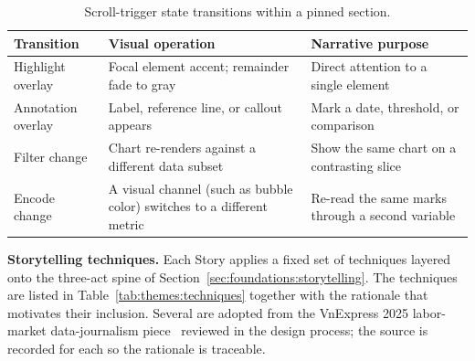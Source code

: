 \begin{table}[!htbp]
\centering
\caption{Scroll-trigger state transitions within a pinned section.}
\label{tab:themes:transitions}
\footnotesize
\renewcommand{\arraystretch}{1.3}
\begin{tabularx}{\linewidth}{p{3.0cm} X X}
\hline
\textbf{Transition} & \textbf{Visual operation} & \textbf{Narrative purpose} \\
\hline
Highlight overlay   & Focal element accent; remainder fade to gray       & Direct attention to a single element \\
Annotation overlay  & Label, reference line, or callout appears          & Mark a date, threshold, or comparison \\
Filter change       & Chart re-renders against a different data subset   & Show the same chart on a contrasting slice \\
Encode change       & A visual channel (such as bubble color) switches to a different metric & Re-read the same marks through a second variable \\
\hline
\end{tabularx}
\end{table}

\noindent\textbf{Storytelling techniques.} Each Story applies a fixed set of techniques layered onto the
three-act spine of Section~\ref{sec:foundations:storytelling}. The
techniques are listed in Table~\ref{tab:themes:techniques} together
with the rationale that motivates their inclusion. Several are adopted
from the VnExpress 2025 labor-market data-journalism piece~\cite{vnexpress2025labour} reviewed in
the design process; the source is recorded for each so the rationale
is traceable.

